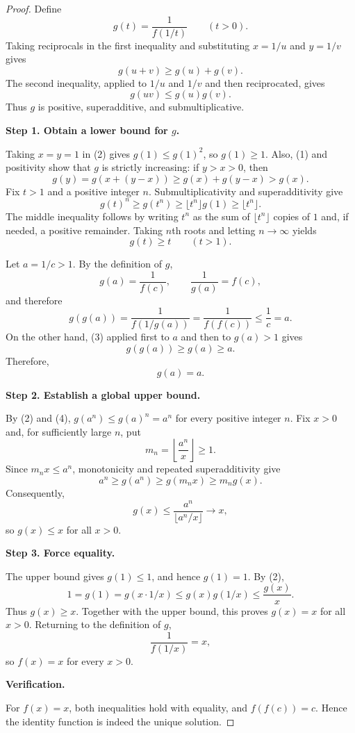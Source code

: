 
\begin{dlsummary}[title={\bfseries Solution 11. The Harmonic--Product Squeeze},breakable]

\begin{proof}
Define
\[
g(t)=\frac1{f(1/t)}\qquad(t>0).
\]
Taking reciprocals in the first inequality and substituting
$x=1/u$ and $y=1/v$ gives
\[
g(u+v)\geq g(u)+g(v). \tag{1}
\]
The second inequality, applied to $1/u$ and $1/v$ and then reciprocated,
gives
\[
g(uv)\leq g(u)g(v). \tag{2}
\]
Thus $g$ is positive, superadditive, and submultiplicative.

\medskip
\noindent
\textbf{Step 1. Obtain a lower bound for $g$.}

Taking $x=y=1$ in (2) gives $g(1)\leq g(1)^2$, so $g(1)\geq1$.
Also, (1) and positivity show that $g$ is strictly increasing: if
$y>x>0$, then
\[
g(y)=g(x+(y-x))\geq g(x)+g(y-x)>g(x).
\]
Fix $t>1$ and a positive integer $n$. Submultiplicativity and
superadditivity give
\[
g(t)^n\geq g(t^n)\geq\lfloor t^n\rfloor g(1)
\geq\lfloor t^n\rfloor.
\]
The middle inequality follows by writing $t^n$ as the sum of
$\lfloor t^n\rfloor$ copies of $1$ and, if needed, a positive
remainder. Taking $n$th roots and letting $n\to\infty$ yields
\[
g(t)\geq t\qquad(t>1). \tag{3}
\]

Let $a=1/c>1$. By the definition of $g$,
\[
g(a)=\frac1{f(c)},\qquad \frac1{g(a)}=f(c),
\]
and therefore
\[
g(g(a))=\frac1{f(1/g(a))}
       =\frac1{f(f(c))}\leq\frac1c=a.
\]
On the other hand, (3) applied first to $a$ and then to $g(a)>1$ gives
\[
g(g(a))\geq g(a)\geq a.
\]
Therefore,
\[
g(a)=a. \tag{4}
\]

\medskip
\noindent
\textbf{Step 2. Establish a global upper bound.}

By (2) and (4), $g(a^n)\leq g(a)^n=a^n$ for every positive integer
$n$. Fix $x>0$ and, for sufficiently large $n$, put
\[
m_n=\left\lfloor\frac{a^n}{x}\right\rfloor\geq1.
\]
Since $m_nx\leq a^n$, monotonicity and repeated superadditivity give
\[
a^n\geq g(a^n)\geq g(m_nx)\geq m_ng(x).
\]
Consequently,
\[
g(x)\leq\frac{a^n}{\lfloor a^n/x\rfloor}\longrightarrow x,
\]
so $g(x)\leq x$ for all $x>0$.

\medskip
\noindent
\textbf{Step 3. Force equality.}

The upper bound gives $g(1)\leq1$, and hence $g(1)=1$. By (2),
\[
1=g(1)=g(x\cdot1/x)\leq g(x)g(1/x)\leq\frac{g(x)}x.
\]
Thus $g(x)\geq x$. Together with the upper bound, this proves
$g(x)=x$ for all $x>0$. Returning to the definition of $g$,
\[
\frac1{f(1/x)}=x,
\]
so $f(x)=x$ for every $x>0$.

\medskip
\noindent
\textbf{Verification.}

For $f(x)=x$, both inequalities hold with equality, and
$f(f(c))=c$. Hence the identity function is indeed the unique solution.
\end{proof}

\end{dlsummary}